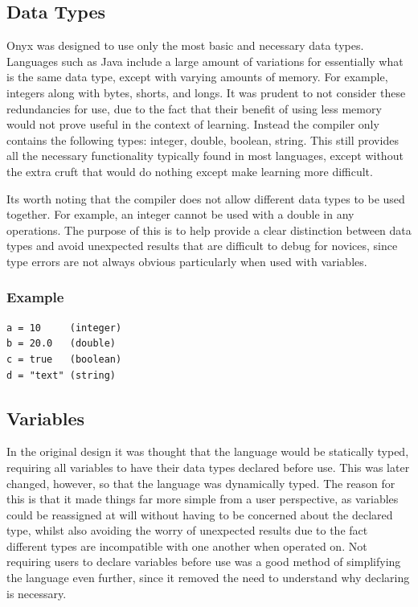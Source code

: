 \documentclass[
]{report}
\begin{document}
\subsection{Data Types}
Onyx was designed to use only the most basic and necessary data types.
Languages such as Java include a large amount of variations for
essentially what is the same data type, except with varying amounts of
memory. For example, integers along with bytes, shorts, and longs. It
was prudent to not consider these redundancies for use, due to the fact
that their benefit of using less memory would not prove useful in the
context of learning. Instead the compiler only contains the following
types: integer, double, boolean, string. This still provides all the
necessary functionality typically found in most languages, except
without the extra cruft that would do nothing except make learning more
difficult.

Its worth noting that the compiler does not allow different data types
to be used together. For example, an integer cannot be used with a
double in any operations. The purpose of this is to help provide a clear
distinction between data types and avoid unexpected results that are
difficult to debug for novices, since type errors are not always obvious
particularly when used with variables.

\subsubsection{Example}
\begin{verbatim}
a = 10     (integer)
b = 20.0   (double)
c = true   (boolean)
d = "text" (string)
\end{verbatim}

\subsection{Variables}
In the original design it was thought that the language would be
statically typed, requiring all variables to have their data types
declared before use. This was later changed, however, so that the
language was dynamically typed. The reason for this is that it made
things far more simple from a user perspective, as variables could be
reassigned at will without having to be concerned about the declared
type, whilst also avoiding the worry of unexpected results due to the
fact different types are incompatible with one another when operated on.
Not requiring users to declare variables before use was a good method of
simplifying the language even further, since it removed the need to
understand why declaring is necessary.
\end{document}
